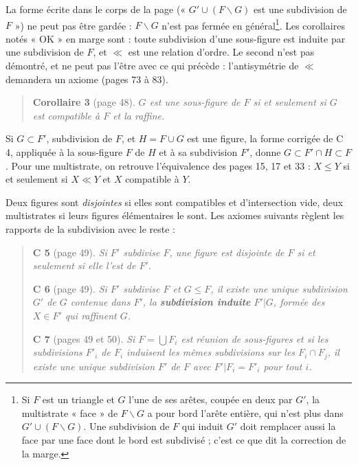 \documentclass[11pt,a4paper]{article}
\begin{document}
La forme écrite dans le corps de la page (« $G' \cup (F \smallsetminus G)$
est une subdivision de $F$ ») ne peut pas être gardée : $F \smallsetminus G$
n'est pas fermée en général\footnote{Si $F$ est un triangle et $G$ l'une de ses
arêtes, coupée en deux par $G'$, la multistrate « face » de $F \smallsetminus
G$ a pour bord l'arête entière, qui n'est plus dans $G' \cup (F \smallsetminus
G)$. Une subdivision de $F$ qui induit $G'$ doit remplacer aussi la face par
une face dont le bord est subdivisé ; c'est ce que dit la correction de la
marge.}. Les corollaires notés « OK » en marge sont : toute subdivision d'une
sous-figure est induite par une subdivision de $F$, et $\ll$ est une relation
d'ordre. Le second n'est pas démontré, et ne peut pas l'être avec ce qui
précède : l'antisymétrie de $\ll$ demandera un axiome (pages 73 à 83).

\begin{quote}
\textbf{Corollaire 3} (page 48). \emph{$G$ est une sous-figure de $F$ si et
seulement si $G$ est compatible à $F$ et la raffine.}
\end{quote}

Si $G \subset F'$, subdivision de $F$, et $H = F \cup G$ est une figure, la
forme corrigée de C 4, appliquée à la sous-figure $F$ de $H$ et à sa subdivision
$F'$, donne $G \subset F' \cap H \subset F$. Pour une multistrate, on retrouve
l'équivalence des pages 15, 17 et 33 : $X \leq Y$ si et seulement si $X \ll Y$
et $X$ compatible à $Y$.

Deux figures sont \emph{disjointes} si elles sont compatibles et d'intersection
vide, deux multistrates si leurs figures élémentaires le sont. Les axiomes
suivants règlent les rapports de la subdivision avec le reste :

\begin{quote}
\textbf{C 5} (page 49). \emph{Si $F'$ subdivise $F$, une figure est disjointe
de $F$ si et seulement si elle l'est de $F'$.}

\textbf{C 6} (page 49). \emph{Si $F'$ subdivise $F$ et $G \leq F$, il existe
une unique subdivision $G'$ de $G$ contenue dans $F'$, la \textbf{subdivision
induite} $F'|G$, formée des $X \in F'$ qui raffinent $G$.}

\textbf{C 7} (pages 49 et 50). \emph{Si $F = \bigcup F_{i}$ est réunion de
sous-figures et si les subdivisions $F'_{i}$ de $F_{i}$ induisent les mêmes
subdivisions sur les $F_{i} \cap F_{j}$, il existe une unique subdivision $F'$
de $F$ avec $F'|F_{i} = F'_{i}$ pour tout $i$.}
\end{quote}
\end{document}
